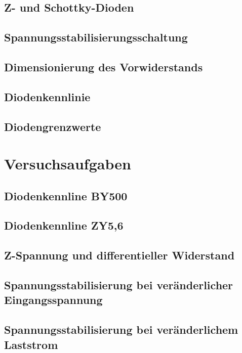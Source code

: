 \documentclass[a4paper, 12pt]{article}
\begin{document}
\subsection{Z- und Schottky-Dioden}

\subsection{Spannungsstabilisierungsschaltung}

\subsection{Dimensionierung des Vorwiderstands}

\subsection{Diodenkennlinie}

\subsection{Diodengrenzwerte}


\section{Versuchsaufgaben}

\subsection{Diodenkennline BY500}

\subsection{Diodenkennline ZY5,6}

\subsection{Z-Spannung und differentieller Widerstand}

\subsection{Spannungsstabilisierung bei veränderlicher Eingangsspannung}

\subsection{Spannungsstabilisierung bei veränderlichem Laststrom}
\end{document}
